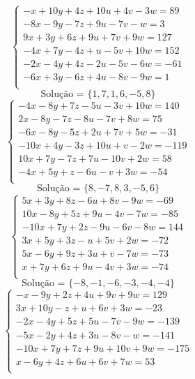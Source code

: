 \documentclass[12pt,oneside,a4paper]{article}
\begin{document}
\vspace{\baselineskip}
\begin{equation*}
\begin{cases}
-x+10y+4z+10u+4v-3w=89 \\
-8x-9y-7z+9u-7v-w=3 \\
9x+3y+6z+9u+7v+9w=127 \\
-4x+7y-4z+u-5v+10w=152 \\
-2x-4y+4z-2u-5v-6w=-61 \\
-6x+3y-6z+4u-8v-9w=1 \\
\end{cases}
\end{equation*}
\begin{equation*}
\text{Solução = }\{1,7,1,6,-5,8\}
\end{equation*}
\vspace{\baselineskip}
\begin{equation*}
\begin{cases}
-4x-8y+7z-5u-3v+10w=140 \\
2x-8y-7z-8u-7v+8w=75 \\
-6x-8y-5z+2u+7v+5w=-31 \\
-10x+4y-3z+10u+v-2w=-119 \\
10x+7y-7z+7u-10v+2w=58 \\
-4x+5y+z-6u-v+3w=-54 \\
\end{cases}
\end{equation*}
\begin{equation*}
\text{Solução = }\{8,-7,8,3,-5,6\}
\end{equation*}
\vspace{\baselineskip}
\begin{equation*}
\begin{cases}
5x+3y+8z-6u+8v-9w=-69 \\
10x-8y+5z+9u-4v-7w=-85 \\
-10x+7y+2z-9u-6v-8w=144 \\
3x+5y+3z-u+5v+2w=-72 \\
5x-6y+9z+3u+v-7w=-73 \\
x+7y+6z+9u-4v+3w=-74 \\
\end{cases}
\end{equation*}
\begin{equation*}
\text{Solução = }\{-8,-1,-6,-3,-4,-4\}
\end{equation*}
\vspace{\baselineskip}
\begin{equation*}
\begin{cases}
-x-9y+2z+4u+9v+9w=129 \\
3x+10y-z+u+6v+3w=-23 \\
-2x-4y+5z+5u-7v-9w=-139 \\
-5x-2y+4z+3u-8v-w=-141 \\
-10x+7y+7z+9u+10v+9w=-175 \\
x-6y+4z+6u+6v+7w=53 \\
\end{cases}
\end{equation*}
\end{document}
